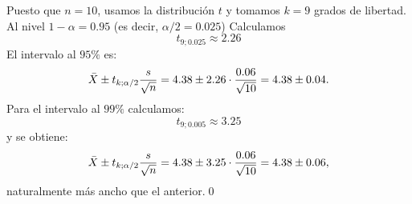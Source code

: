 \begin{itemize}
\begin{ejemplo}
       Puesto que $n=10$, usamos la distribución $t$ y tomamos $k=9$ grados de libertad. Al nivel $1-\alpha=0.95$ (es decir, $\alpha/2=0.025$) Calculamos
       \[t_{9;0.025}\approx 2.26\]
       El intervalo al $95\%$ es:
       \[\bar X \pm \textcolor{black}{\mbox{$t_{k;\alpha/2}$}}\dfrac{s}{\sqrt{n}}=4.38\pm 2.26\cdot\dfrac{0.06}{\sqrt{10}}=4.38\pm 0.04.\]
       Para el intervalo al $99\%$ calculamos:
       \[t_{9;0.005}\approx 3.25\]
       y se obtiene:
       \[\bar X \pm \textcolor{black}{\mbox{$t_{k;\alpha/2}$}}\dfrac{s}{\sqrt{n}}=4.38\pm 3.25\cdot\dfrac{0.06}{\sqrt{10}}=4.38\pm 0.06,\]
       naturalmente más ancho que el anterior.\qed
       \end{ejemplo}

       \end{itemize}

%
%
%
%
